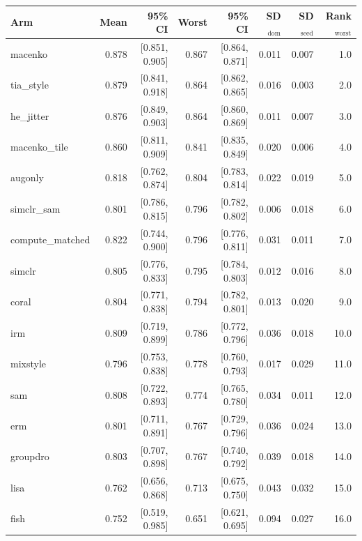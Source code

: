 \begin{tabular}{lrrrrrrr}
\toprule
Arm & Mean & 95\% CI & Worst & 95\% CI & SD$_\text{dom}$ & SD$_\text{seed}$ & Rank$_\text{worst}$ \\
\midrule
macenko & 0.878 & [0.851, 0.905] & 0.867 & [0.864, 0.871] & 0.011 & 0.007 & 1.0 \\
tia\_style & 0.879 & [0.841, 0.918] & 0.864 & [0.862, 0.865] & 0.016 & 0.003 & 2.0 \\
he\_jitter & 0.876 & [0.849, 0.903] & 0.864 & [0.860, 0.869] & 0.011 & 0.007 & 3.0 \\
macenko\_tile & 0.860 & [0.811, 0.909] & 0.841 & [0.835, 0.849] & 0.020 & 0.006 & 4.0 \\
augonly & 0.818 & [0.762, 0.874] & 0.804 & [0.783, 0.814] & 0.022 & 0.019 & 5.0 \\
simclr\_sam & 0.801 & [0.786, 0.815] & 0.796 & [0.782, 0.802] & 0.006 & 0.018 & 6.0 \\
compute\_matched & 0.822 & [0.744, 0.900] & 0.796 & [0.776, 0.811] & 0.031 & 0.011 & 7.0 \\
simclr & 0.805 & [0.776, 0.833] & 0.795 & [0.784, 0.803] & 0.012 & 0.016 & 8.0 \\
coral & 0.804 & [0.771, 0.838] & 0.794 & [0.782, 0.801] & 0.013 & 0.020 & 9.0 \\
irm & 0.809 & [0.719, 0.899] & 0.786 & [0.772, 0.796] & 0.036 & 0.018 & 10.0 \\
mixstyle & 0.796 & [0.753, 0.838] & 0.778 & [0.760, 0.793] & 0.017 & 0.029 & 11.0 \\
sam & 0.808 & [0.722, 0.893] & 0.774 & [0.765, 0.780] & 0.034 & 0.011 & 12.0 \\
erm & 0.801 & [0.711, 0.891] & 0.767 & [0.729, 0.796] & 0.036 & 0.024 & 13.0 \\
groupdro & 0.803 & [0.707, 0.898] & 0.767 & [0.740, 0.792] & 0.039 & 0.018 & 14.0 \\
lisa & 0.762 & [0.656, 0.868] & 0.713 & [0.675, 0.750] & 0.043 & 0.032 & 15.0 \\
fish & 0.752 & [0.519, 0.985] & 0.651 & [0.621, 0.695] & 0.094 & 0.027 & 16.0 \\
\bottomrule
\end{tabular}
